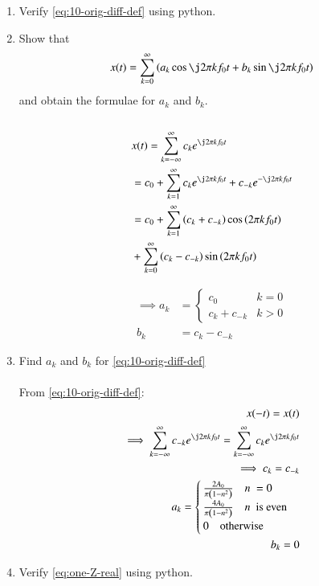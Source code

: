 \documentclass[journal,12pt,twocolumn]{IEEEtran}
\renewcommand\thesection{\arabic{section}}
\begin{document}
\begin{enumerate}[label=\thesection.\arabic*,ref=\thesection.\theenumi]
\item Verify 
	\eqref{eq:10-orig-diff-def}
	using python.
	\item Show that 
\begin{align}
	x(t) = \sum_{k = 0}^{\infty}\brak{a_k\cos{\j2\pi kf_0 t}+b_k\sin{\j2\pi kf_0 t}}
\label{eq:one-Z-real}
\end{align}
and obtain the formulae for $a_k$ and $b_k$.\\
\solution\\
\begin{align}
	&x(t) = \sum_{k = -\infty}^{\infty}c_ke^{\j2\pi kf_0 t} \\
	&= c_0 + \sum_{k = 1}^{\infty}c_ke^{\j2\pi kf_0t} + c_{-k}e^{-\j2\pi kf_0t} \\
	&= c_0 + \sum_{k = 1}^{\infty}\brak{c_k + c_{-k}}\cos\brak{2\pi kf_0t}  \nonumber \\
	&+ \sum_{k = 0}^{\infty}\brak{c_k - c_{-k}}\sin\brak{2\pi kf_0t}
\end{align}

\begin{align}
	\implies
	a_k &= 
	\begin{cases}
		c_0 & k = 0 \\
		c_k + c_{-k} & k > 0
	\end{cases} \label{eq:ak} \\
	b_k &= c_k - c_{-k}
	\label{eq:bk}
\end{align}
\item Find $a_k$ and $b_k$ for 
\eqref{eq:10-orig-diff-def}\\
\solution\\
From \eqref{eq:10-orig-diff-def}:
\begin{align}
	x(-t) = x(t)\\
	\implies \sum_{k = -\infty}^{\infty}c_{-k}e^{\j2\pi kf_0t}
	= \sum_{k = -\infty}^{\infty}c_ke^{\j2\pi kf_0 t}\\
	\implies c_k = c_{-k}\\
	a_k = \begin{cases}
		\frac{2A_0}{\pi\brak{1-n^2}} \quad n\ = 0\\
		\frac{4A_0}{\pi\brak{1-n^2}} \quad n\ \text{ is even}\\
		0 \quad \text{otherwise}
	\end{cases}\\
	b_k = 0
\end{align}
\item Verify 
\eqref{eq:one-Z-real}
using python.

\end{enumerate}
\end{document}
